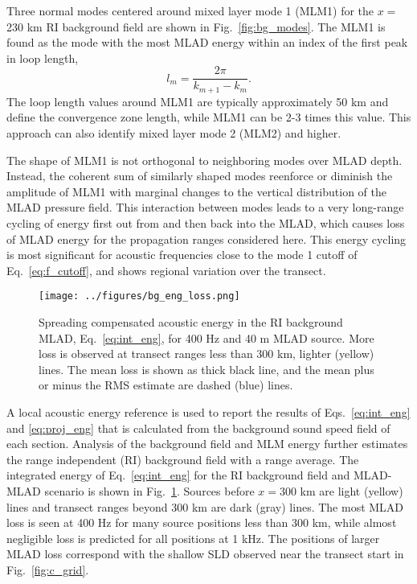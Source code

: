 \documentclass[preprint,NumberedRefs]{JASA}
\begin{document}
Three normal modes centered around mixed layer mode 1 (MLM1) for the $x=$230 km RI background field are shown in Fig.~\ref{fig:bg_modes}. The MLM1 is found as the mode with the most MLAD energy within an index of the first peak in loop length\citep{jensen2011computational},
\begin{equation}
    l_{m} = \frac{2 \pi}{k_{m+1} - k_m}.
    \label{eq:loop_length}
\end{equation}
The loop length values around MLM1 are typically approximately 50 km and define the convergence zone length, while MLM1 can be 2-3 times this value. This approach can also identify mixed layer mode 2 (MLM2) and higher.

The shape of MLM1 is not orthogonal to neighboring modes over MLAD depth. Instead, the coherent sum of similarly shaped modes reenforce or diminish the amplitude of MLM1 with marginal changes to the vertical distribution of the MLAD pressure field. This interaction between modes leads to a very long-range cycling of energy first out from and then back into the MLAD\citep{porter93,colosi2020observations}, which causes loss of MLAD energy for the propagation ranges considered here. This energy cycling is most significant for acoustic frequencies close to the mode 1 cutoff of Eq.~\eqref{eq:f_cutoff}, and shows regional variation over the transect.

\begin{figure}
\texttt{[image: ../figures/bg\_eng\_loss.png]}
    \caption{Spreading compensated acoustic energy in the RI background MLAD, Eq.~\eqref{eq:int_eng}, for 400 Hz and 40 m MLAD source. More loss is observed at transect ranges less than 300 km, lighter (yellow) lines. The mean loss is shown as thick black line, and the mean plus or minus the RMS estimate are dashed (blue) lines.}
    \label{fig:bg_eng}
\end{figure}
A local acoustic energy reference is used to report the results of Eqs.~\ref{eq:int_eng} and \ref{eq:proj_eng} that is calculated from the background sound speed field of each section. Analysis of the background field and MLM energy further estimates the range independent (RI) background field with a range average. The integrated energy of Eq.~\eqref{eq:int_eng} for the RI background field and MLAD-MLAD scenario is shown in Fig.~\ref{fig:bg_eng}. Sources before $x=$300 km are light (yellow) lines and transect ranges beyond 300 km are dark (gray) lines. The most MLAD loss is seen at 400 Hz for many source positions less than 300 km, while almost negligible loss is predicted for all positions at 1 kHz. The positions of larger MLAD loss correspond with the shallow SLD observed near the transect start in Fig.~\ref{fig:c_grid}.
\end{document}
